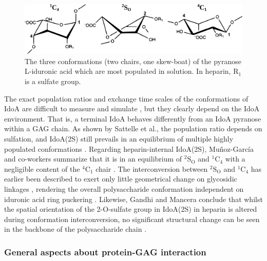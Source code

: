 \begin{figure}
\centering
\includegraphics[width=1.0\textwidth]{gfx/background/idoa_conformations_03.pdf}
\caption[]{
The three conformations (two chairs, one skew-boat) of the pyranose L-iduronic
acid which are most populated in solution. In heparin, $\mathrm{R}_1$ is a
sulfate group.}
\label{fig:bg:idoa_conformations}
\end{figure}


The exact population ratios and exchange time scales of the conformations of
IdoA are difficult to measure and simulate \cite{almond_jacs_2010,
structure_gags_progess_perspectives_2010}, but they clearly depend on the IdoA
environment. That is, a terminal IdoA behaves differently from an IdoA pyranose
within a GAG chain. As shown by Sattelle et al., the population ratio depends on
sulfation, and IdoA(2S) still prevails in an equilibrium of multiple highly
populated conformations \cite{almond_jacs_2010}. Regarding heparin-internal
IdoA(2S), Muñoz-García and co-workers summarize that it is in an equilibrium of
${}^{2}\mathrm{S}_\mathrm{O}$ and ${}^{1}\mathrm{C}_4$ with a negligible content
of the ${}^{4}\mathrm{C}_1$ chair \cite{conf_idoa_timeavg_restraints_2013}. The
interconversion between ${}^{2}\mathrm{S}_\mathrm{O}$ and ${}^{1}\mathrm{C}_4$
has earlier been described to exert only little geometrical change on glycosidic
linkages \cite{Mulloy_dyn_conf_heparin_2000}, rendering the overall
polysaccharide conformation independent on iduronic acid ring puckering
\cite{jin_heparin_2009}. Likewise, Gandhi and Mancera conclude that whilst the
spatial orientation of the 2-O-sulfate group in IdoA(2S) in heparin is altered
during conformation interconversion, no significant structural change can be
seen in the backbone of the polysaccharide chain \cite{gandhi_structure_2008}.


\subsubsection{General aspects about protein-GAG interaction}

